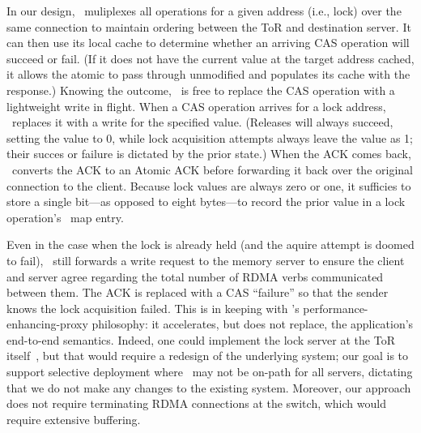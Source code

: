 In our design, \sword\ muliplexes all operations for a given address
(i.e., lock) over the same connection to maintain ordering between the
ToR and destination server.  It can then use its local cache to
determine whether an arriving CAS operation will succeed or fail.  (If
it does not have the current value at the target address cached, it
allows the atomic to pass through unmodified and populates its cache
with the response.)  Knowing the outcome, \sword\ is free to replace
the CAS operation with a lightweight write in flight.  When a CAS
operation arrives for a lock address, \sword\ replaces it with a write
for the specified value.  (Releases will always succeed, setting the
value to 0, while lock acquisition attempts always leave the value as
1; their succes or failure is dictated by the prior state.)  When the
ACK comes back, \sword\ converts the ACK to an Atomic ACK before
forwarding it back over the original connection to the client.
Because lock values are always zero or one, it sufficies to store a
single bit---as opposed to eight bytes---to record the prior value in
a lock operation's \sword\ map entry.

Even in the case when the lock is already held (and the aquire attempt
is doomed to fail), \sword\ still forwards a write request to the
memory server to ensure the client and server agree regarding the
total number of RDMA verbs communicated between them.  The ACK
is replaced with a CAS ``failure'' so that the sender knows the lock
acquisition failed.  This is in keeping with \sword's
performance-enhancing-proxy philosophy: it accelerates, but does not
replace, the application's end-to-end semantics.
Indeed, one could implement the lock server at the ToR
itself~\cite{netlock}, but that would require a redesign of the
underlying system; our goal is to support selective deployment where
\sword\ may not be on-path for all servers, dictating that we do not
make any changes to the existing system.  Moreover, our approach does
not require terminating RDMA connections at the switch, which would
require extensive buffering.




